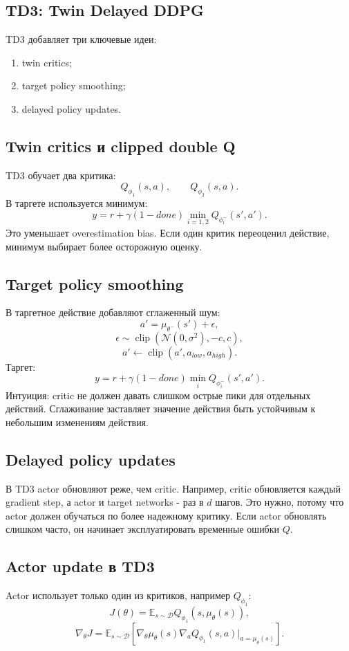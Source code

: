 \documentclass[11pt,a4paper]{article}
\newcommand{\E}{\mathbb{E}}
\newcommand{\clip}{\operatorname{clip}}
\newcommand{\1}{\mathbf{1}}
\newcommand{\cD}{\mathcal D}
\begin{document}
\subsection*{TD3: Twin Delayed DDPG}
TD3 добавляет три ключевые идеи:
\begin{enumerate}
    \item twin critics;
    \item target policy smoothing;
    \item delayed policy updates.
\end{enumerate}

\subsection*{Twin critics и clipped double Q}
TD3 обучает два критика:
\[
    Q_{\phi_1}(s,a),\qquad Q_{\phi_2}(s,a).
\]
В таргете используется минимум:
\[
    y=r+\gamma(1-done)\min_{i=1,2}Q_{\phi_i^-}(s',a').
\]
Это уменьшает overestimation bias. Если один критик переоценил действие, минимум выбирает более осторожную оценку.

\subsection*{Target policy smoothing}
В таргетное действие добавляют сглаженный шум:
\[
    a'=\mu_{\theta^-}(s')+\epsilon,
\]
\[
    \epsilon\sim\clip(\mathcal N(0,\sigma^2),-c,c),
\]
\[
    a'\leftarrow\clip(a',a_{low},a_{high}).
\]
Таргет:
\[
    y=r+\gamma(1-done)\min_i Q_{\phi_i^-}(s',a').
\]
Интуиция: critic не должен давать слишком острые пики для отдельных действий. Сглаживание заставляет значение действия быть устойчивым к небольшим изменениям действия.

\subsection*{Delayed policy updates}
В TD3 actor обновляют реже, чем critic. Например, critic обновляется каждый gradient step, а actor и target networks - раз в $d$ шагов. Это нужно, потому что actor должен обучаться по более надежному критику. Если actor обновлять слишком часто, он начинает эксплуатировать временные ошибки $Q$.

\subsection*{Actor update в TD3}
Actor использует только один из критиков, например $Q_{\phi_1}$:
\[
    J(\theta)=\E_{s\sim\cD}Q_{\phi_1}(s,\mu_\theta(s)),
\]
\[
    \nabla_\theta J=\E_{s\sim\cD}\left[
    \nabla_\theta\mu_\theta(s)\nabla_aQ_{\phi_1}(s,a)|_{a=\mu_\theta(s)}
    \right].
\]
\end{document}
